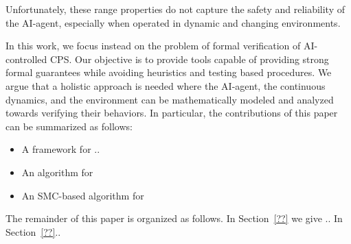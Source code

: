 




Unfortunately, these range properties do not capture the safety and reliability of the AI-agent, especially when operated in dynamic and changing environments.




In this work, we focus instead on the problem of formal verification of AI-controlled CPS. Our objective is to provide tools capable of providing strong formal guarantees while avoiding heuristics and testing based procedures. We argue that a holistic approach is needed where the AI-agent, the continuous dynamics, and the environment can be mathematically modeled and analyzed towards verifying their behaviors. In particular, the contributions of this paper can be summarized as follows:
\begin{itemize}
	\item A framework for ..
	\item An algorithm for
	\item An SMC-based algorithm for
\end{itemize}
The remainder of this paper is organized as follows. In Section~\ref{??} we give .. In Section~\ref{??}..










